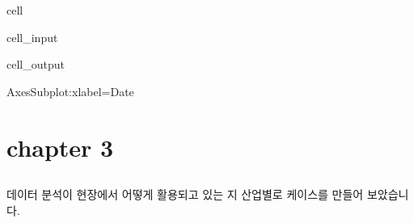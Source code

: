 \documentclass[letterpaper,10pt,english]{jupyterBook}
\begin{document}
\begin{sphinxuseclass}{cell}\begin{sphinxVerbatimInput}

\begin{sphinxuseclass}{cell_input}
\begin{sphinxVerbatim}[commandchars=\\\{\}]
   
     
\PYG{p}{[}\PYG{p}{]}
\end{sphinxVerbatim}

\end{sphinxuseclass}\end{sphinxVerbatimInput}
\begin{sphinxVerbatimOutput}

\begin{sphinxuseclass}{cell_output}
\begin{sphinxVerbatim}[commandchars=\\\{\}]
\PYGZlt{}AxesSubplot:xlabel=\PYGZsq{}Date\PYGZsq{}\PYGZgt{}
\end{sphinxVerbatim}

\noindent{}

\end{sphinxuseclass}\end{sphinxVerbatimOutput}

\end{sphinxuseclass}

\part{chapter 3}


\chapter{}
\label{\detokenize{chapter3/3.1.0_Use_Case:id1}}\label{\detokenize{chapter3/3.1.0_Use_Case::doc}}
\sphinxAtStartPar
데이터 분석이 현장에서 어떻게 활용되고 있는 지 산업별로 케이스를 만들어 보았습니다.
\end{document}
